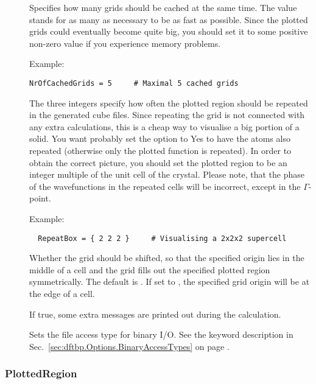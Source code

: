 \begin{description}
\item[] Specifies how many grids should be cached
  at the same time. The value  stands for as many as necessary
  to be as fast as possible. Since the plotted grids could eventually
  become quite big, you should set it to some positive non-zero value
  if you experience memory problems.

Example:
\begin{verbatim}
NrOfCachedGrids = 5     # Maximal 5 cached grids
\end{verbatim}

\item[] The three integers specify how often the plotted
  region should be repeated in the generated cube files. Since
  repeating the grid is not connected with any extra calculations,
  this is a cheap way to visualise a big portion of a solid.  You want
  probably set the  option to Yes to have the
  atoms also repeated (otherwise only the plotted function is
  repeated).  In order to obtain the correct picture, you should set
  the plotted region to be an integer multiple of the unit cell of the
  crystal. Please note, that the phase of the wavefunctions in the
  repeated cells will be incorrect, except in the $\Gamma$-point.

Example:
\begin{verbatim}
  RepeatBox = { 2 2 2 }     # Visualising a 2x2x2 supercell
\end{verbatim}

\item[] Whether the grid should be shifted, so that the specified
  origin lies in the middle of a cell and the grid fills out the specified
  plotted region symmetrically. The default is . If set to , the
  specified grid origin will be at the edge of a cell.

\item[] If true, some extra messages are printed out
  during the calculation.

\item[] Sets the file access type for binary I/O. See the
  keyword description in Sec.~\ref{sec:dftbp.Options.BinaryAccessTypes} on page
  .

\end{description}


\subsubsection{PlottedRegion}
\label{sec:waveplot.PlottedRegion}

